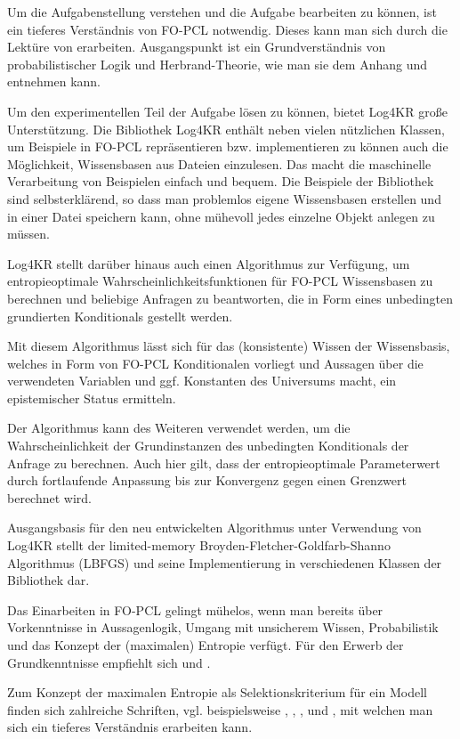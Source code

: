\documentclass[a4paper, 11pt]{book}
\begin{document}
Um die Aufgabenstellung verstehen und die Aufgabe bearbeiten zu können, ist ein tieferes Verständnis von FO-PCL notwendig. Dieses kann man sich durch die Lektüre von \cite{Fis10} erarbeiten. Ausgangspunkt ist ein Grundverständnis von probabilistischer Logik und Herbrand-Theorie, wie man sie dem Anhang und \cite{BK15} entnehmen kann.


Um den experimentellen Teil der Aufgabe lösen zu können, bietet Log4KR große Unterstützung.
Die Bibliothek Log4KR enthält neben vielen nützlichen Klassen, um Beispiele in FO-PCL repräsentieren bzw. implementieren zu können auch die Möglichkeit, Wissensbasen aus Dateien einzulesen. Das macht die maschinelle Verarbeitung von Beispielen einfach und bequem. Die Beispiele der Bibliothek sind selbsterklärend, so dass man problemlos eigene Wissensbasen erstellen und in einer Datei speichern kann, ohne mühevoll jedes einzelne Objekt anlegen zu müssen.

Log4KR stellt darüber hinaus auch einen Algorithmus zur Verfügung, um entropieoptimale Wahrscheinlichkeitsfunktionen für FO-PCL Wissensbasen zu berechnen und beliebige Anfragen zu beantworten, die in Form eines unbedingten grundierten Konditionals gestellt werden. 

Mit diesem Algorithmus lässt sich für das (konsistente) Wissen der Wissensbasis, welches in Form von FO-PCL Konditionalen vorliegt und Aussagen über die verwendeten Variablen und ggf. Konstanten des Universums macht, ein epistemischer Status ermitteln.

Der Algorithmus kann des Weiteren verwendet werden, um die Wahrscheinlichkeit der Grundinstanzen  des unbedingten Konditionals der Anfrage zu berechnen. Auch hier gilt, dass der entropieoptimale Parameterwert durch fortlaufende Anpassung bis zur Konvergenz gegen einen Grenzwert berechnet wird. 

Ausgangsbasis für den neu entwickelten Algorithmus unter Verwendung von Log4KR stellt der limited-memory Broyden-Fletcher-Goldfarb-Shanno Algorithmus (LBFGS) und seine Implementierung in verschiedenen Klassen der Bibliothek dar. 

Das Einarbeiten in FO-PCL gelingt mühelos, wenn man bereits über Vorkenntnisse in Aussagenlogik, Umgang mit unsicherem Wissen, Probabilistik  und das Konzept der (maximalen) Entropie verfügt. Für den Erwerb der Grundkenntnisse empfiehlt sich \cite{BKI08} und \cite{KK06}.

Zum Konzept der maximalen Entropie als Selektionskriterium für ein Modell finden sich zahlreiche Schriften, vgl. beispielsweise \cite{BHM14}, \cite{BK15}, \cite{Fis10}, \cite{RKI97} und \cite{TFLKIB10}, mit welchen man sich ein tieferes Verständnis erarbeiten kann.
\end{document}
